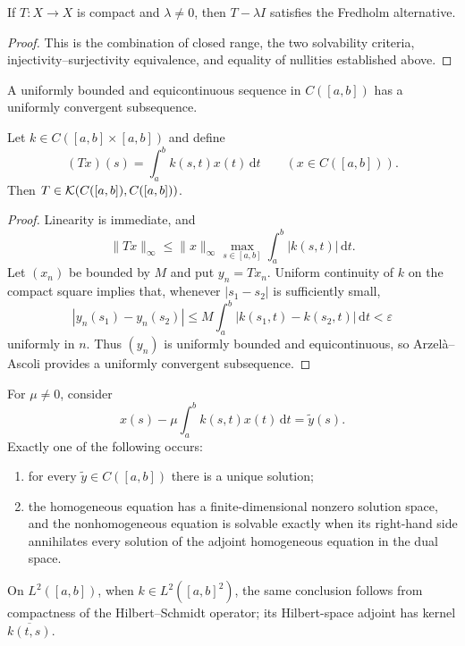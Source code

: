 \begin{notetheorem}
If $T\colon X\to X$ is compact and $\lambda\ne0$, then
$T-\lambda I$ satisfies the Fredholm alternative.
\end{notetheorem}

\begin{proof}
This is the combination of closed range, the two solvability criteria,
injectivity--surjectivity equivalence, and equality of nullities established
above.
\end{proof}

\begin{notetheorem}
A uniformly bounded and equicontinuous sequence in $C([a,b])$ has a uniformly
convergent subsequence.
\end{notetheorem}

\begin{notetheorem}
Let $k\in C([a,b]\times[a,b])$ and define
\[
  (Tx)(s)=\int_a^b k(s,t)x(t)\,\mathrm dt
  \qquad(x\in C([a,b])).
\]
Then $T\in\mathcal{K}(C([a,b]),C([a,b]))$.
\end{notetheorem}

\begin{proof}
Linearity is immediate, and
\[
  \|Tx\|_\infty
  \le \|x\|_\infty
      \max_{s\in[a,b]}\int_a^b|k(s,t)|\,\mathrm dt.
\]
Let $(x_n)$ be bounded by $M$ and put $y_n=Tx_n$.  Uniform continuity of $k$
on the compact square implies that, whenever $|s_1-s_2|$ is sufficiently
small,
\[
  |y_n(s_1)-y_n(s_2)|
  \le M\int_a^b|k(s_1,t)-k(s_2,t)|\,\mathrm dt
  <\varepsilon
\]
uniformly in $n$.  Thus $(y_n)$ is uniformly bounded and equicontinuous, so
Arzel\`a--Ascoli provides a uniformly convergent subsequence.
\end{proof}

\begin{notecorollary}
For $\mu\ne0$, consider
\[
  x(s)-\mu\int_a^b k(s,t)x(t)\,\mathrm dt=\widetilde y(s).
\]
Exactly one of the following occurs:
\begin{enumerate}
  \item for every $\widetilde y\in C([a,b])$ there is a unique solution;
  \item the homogeneous equation has a finite-dimensional nonzero solution
        space, and the nonhomogeneous equation is solvable exactly when its
        right-hand side annihilates every solution of the adjoint homogeneous
        equation in the dual space.
\end{enumerate}
On $L^2([a,b])$, when $k\in L^2([a,b]^2)$, the same conclusion follows from
compactness of the Hilbert--Schmidt operator; its Hilbert-space adjoint has
kernel $\overline{k(t,s)}$.
\end{notecorollary}
